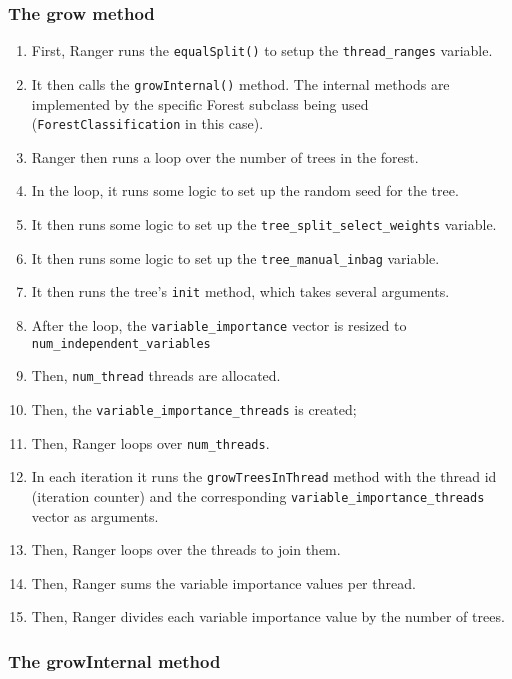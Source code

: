 \documentclass[12pt,oneside]{book}
\begin{document}
\subsubsection{The grow method}

\begin{enumerate}
  \item First, Ranger runs the \lstinline|equalSplit()| to setup the \lstinline|thread_ranges| variable.
  \item It then calls the \lstinline|growInternal()| method. The internal methods are implemented by the specific Forest subclass being used (\lstinline|ForestClassification| in this case).
  \item Ranger then runs a loop over the number of trees in the forest.
  \item In the loop, it runs some logic to set up the random seed for the tree.
  \item It then runs some logic to set up the \lstinline|tree_split_select_weights| variable.
  \item It then runs some logic to set up the \lstinline|tree_manual_inbag| variable.
  \item It then runs the tree's \lstinline|init| method, which takes several arguments.
  \item After the loop, the \lstinline|variable_importance| vector is resized to \lstinline|num_independent_variables|
  \item Then, \lstinline|num_thread| threads are allocated.
  \item Then, the \lstinline|variable_importance_threads| is created;
  \item Then, Ranger loops over \lstinline|num_threads|.
  \item In each iteration it runs the \lstinline|growTreesInThread| method with the thread id (iteration counter) and the corresponding \lstinline|variable_importance_threads| vector as arguments.
  \item Then, Ranger loops over the threads to join them.
  \item Then, Ranger sums the variable importance values per thread.
  \item Then, Ranger divides each variable importance value by the number of trees.
\end{enumerate}

\subsubsection{The growInternal method}
\end{document}
